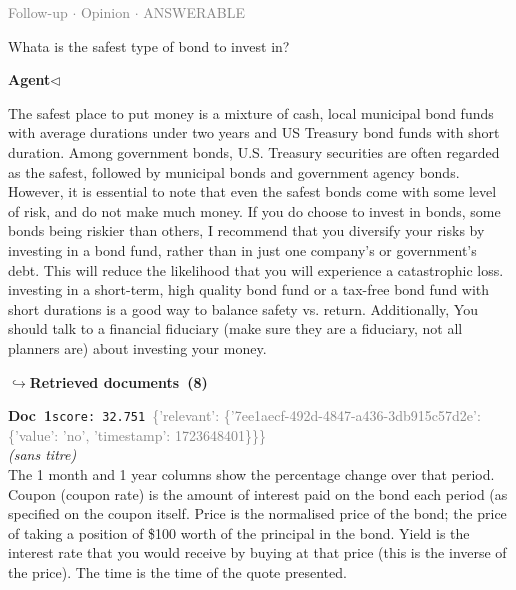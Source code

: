 \documentclass[a4paper,11pt]{article}
\begin{document}
\vspace{0.5em}
\hfill{\tiny\textcolor{gray}{Follow-up $\cdot$ Opinion $\cdot$ ANSWERABLE}}
\begin{userbubble}
Whata is the safest type of bond to invest in?
\end{userbubble}
\noindent\hfill{\small\textcolor{agentcolor}{\textbf{Agent\enspace$\triangleleft$}}}
\begin{agentbubble}
The safest place to put money is a mixture of cash, local municipal bond funds with average durations under two years and US Treasury bond funds with short duration. Among government bonds, U.S. Treasury securities are often regarded as the safest, followed by municipal bonds and government agency bonds. However, it is essential to note that even the safest bonds come with some level of risk, and do not make much money.  If you do choose to invest in bonds, some bonds being riskier than others,  I recommend that you diversify your risks by investing in a bond fund, rather than in just one company's or government's debt. This will reduce the likelihood that you will experience a catastrophic loss. investing in a short-term, high quality bond fund or a tax-free bond fund with short durations is a good way to balance safety vs. return. Additionally, You should talk to a financial fiduciary (make sure they are a fiduciary, not all planners are) about investing your money.
\end{agentbubble}
\noindent\hfill{\footnotesize\textcolor{doccolor}{\textbf{$\hookrightarrow$\enspace Retrieved documents~(8)}}}
\begin{docenv}
{\footnotesize\textcolor{doccolor}{\textbf{Doc~1}}}\hfill{\tiny\texttt{score:~32.751}}\ {\tiny\textcolor{gray}{\{'relevant': \{'7ee1aecf-492d-4847-a436-3db915c57d2e': \{'value': 'no', 'timestamp': 1723648401\}\}\}}}\\[3pt]
{\small\textit{(sans titre)}}\\[2pt]
\vspace{2pt}
{\footnotesize 
The 1 month and 1 year columns show the percentage change over that period. Coupon (coupon rate) is the amount of interest paid on the bond each period (as specified on the coupon itself. Price is the normalised price of the bond; the price of taking a position of \$100 worth of the principal in the bond. Yield is the interest rate that you would receive by buying at that price (this is the inverse of the price). The time is the time of the quote presented.}
\end{docenv}
\end{document}
